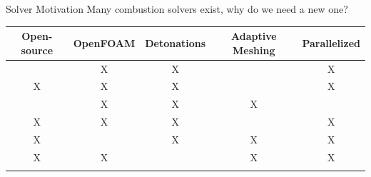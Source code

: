 \begin{frame}{Solver Motivation}
Many combustion solvers exist, why do we need a {\color{red} new one}? 
\begin{table}
\begin{tabular}{|c|c|c|c|c|} \hline
Open-source & OpenFOAM & Detonations & Adaptive Meshing & Parallelized \\ \hline \hline
  & X & X &   & X \\ \hline
X & X & X &   & X \\ \hline
  & X & X & X &   \\ \hline
X & X & X &   & X \\ \hline
X &   & X & X & X \\ \hline
X & X &   & X & X \\ \hline
\color{red}{X} & \color{red}{X} & \color{red}{X} & \color{red}{X} & \color{red}{X} \\ \hline
\end{tabular}
\end{table}
\end{frame}
